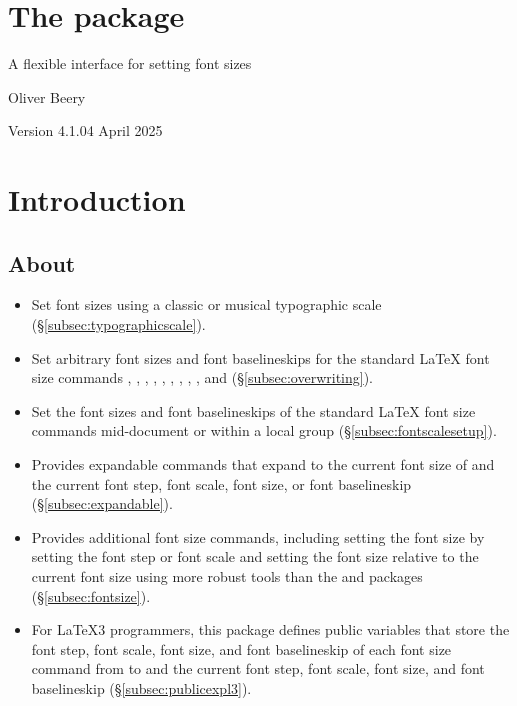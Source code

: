 \documentclass{beery}
\begin{document}
\section*{The  package}

A flexible interface for setting font sizes

Oliver Beery

Version 4.1.0\quad{}4 April 2025


\section{Introduction}
\label{sec:intro}

\subsection{About}
\label{subsec:about}

\begin{itemize}
  \item
  Set font sizes using a classic or musical typographic scale (\S\ref{subsec:typographicscale}).
  \item
  Set arbitrary font sizes and font baselineskips for the standard \LaTeX{} font size commands , , , , , , , , , and  (\S\ref{subsec:overwriting}).
  \item
  Set the font sizes and font baselineskips of the standard \LaTeX{} font size commands mid-document or within a local group (\S\ref{subsec:fontscalesetup}).
  \item
  Provides expandable commands that expand to the current font size of  and the current font step, font scale, font size, or font baselineskip (\S\ref{subsec:expandable}).
  \item
  Provides additional font size commands, including setting the font size by setting the font step or font scale and setting the font size relative to the current font size using more robust tools than the  and  packages (\S\ref{subsec:fontsize}).
  \item
  For \LaTeX3 programmers, this package defines public  variables that store the font step, font scale, font size, and font baselineskip of each font size command from  to  and the current font step, font scale, font size, and font baselineskip (\S\ref{subsec:publicexpl3}).
\end{itemize}
\end{document}
